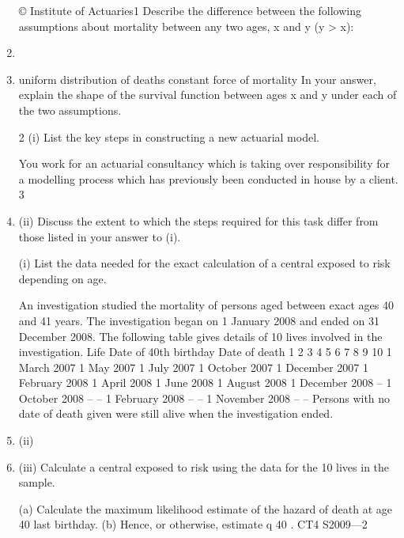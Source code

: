 \documentclass[a4paper,12pt]{article}
\begin{document}
\begin{enumerate}
© Institute of Actuaries1
Describe the difference between the following assumptions about mortality between
any two ages, x and y (y > x):
\item
\item
uniform distribution of deaths
constant force of mortality
In your answer, explain the shape of the survival function between ages x and y under
each of the two assumptions.

2
(i)
List the key steps in constructing a new actuarial model.

You work for an actuarial consultancy which is taking over responsibility for a
modelling process which has previously been conducted in house by a client.
3
\item (ii) Discuss the extent to which the steps required for this task differ from those
listed in your answer to (i).

(i) List the data needed for the exact calculation of a central exposed to risk
depending on age.

An investigation studied the mortality of persons aged between exact ages 40 and 41
years. The investigation began on 1 January 2008 and ended on 31 December 2008.
The following table gives details of 10 lives involved in the investigation.
Life Date of 40th birthday Date of death
1
2
3
4
5
6
7
8
9
10 1 March 2007
1 May 2007
1 July 2007
1 October 2007
1 December 2007
1 February 2008
1 April 2008
1 June 2008
1 August 2008
1 December 2008 –
1 October 2008
–
–
1 February 2008
–
–
1 November 2008
–
–
Persons with no date of death given were still alive when the investigation ended.
\item (ii)
\item (iii)
Calculate a central exposed to risk using the data for the 10 lives in the
sample.

(a) Calculate the maximum likelihood estimate of the hazard of death at
age 40 last birthday.
(b) Hence, or otherwise, estimate q 40 .
CT4 S2009—2



\end{enumerate}
\end{document}
